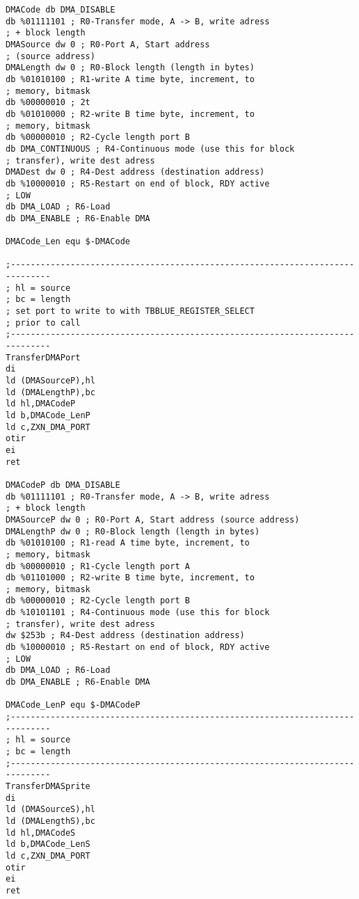 \begin{enumerate}
\begin{verbatim}
DMACode db DMA_DISABLE
db %01111101 ; R0-Transfer mode, A -> B, write adress
; + block length
DMASource dw 0 ; R0-Port A, Start address
; (source address)
DMALength dw 0 ; R0-Block length (length in bytes)
db %01010100 ; R1-write A time byte, increment, to
; memory, bitmask
db %00000010 ; 2t
db %01010000 ; R2-write B time byte, increment, to
; memory, bitmask
db %00000010 ; R2-Cycle length port B
db DMA_CONTINUOUS ; R4-Continuous mode (use this for block
; transfer), write dest adress
DMADest dw 0 ; R4-Dest address (destination address)
db %10000010 ; R5-Restart on end of block, RDY active
; LOW
db DMA_LOAD ; R6-Load
db DMA_ENABLE ; R6-Enable DMA

DMACode_Len equ $-DMACode

;------------------------------------------------------------------------------
; hl = source
; bc = length
; set port to write to with TBBLUE_REGISTER_SELECT
; prior to call
;------------------------------------------------------------------------------
TransferDMAPort
di
ld (DMASourceP),hl
ld (DMALengthP),bc
ld hl,DMACodeP
ld b,DMACode_LenP
ld c,ZXN_DMA_PORT
otir
ei
ret

DMACodeP db DMA_DISABLE
db %01111101 ; R0-Transfer mode, A -> B, write adress
; + block length
DMASourceP dw 0 ; R0-Port A, Start address (source address)
DMALengthP dw 0 ; R0-Block length (length in bytes)
db %01010100 ; R1-read A time byte, increment, to
; memory, bitmask
db %00000010 ; R1-Cycle length port A
db %01101000 ; R2-write B time byte, increment, to
; memory, bitmask
db %00000010 ; R2-Cycle length port B
db %10101101 ; R4-Continuous mode (use this for block
; transfer), write dest adress
dw $253b ; R4-Dest address (destination address)
db %10000010 ; R5-Restart on end of block, RDY active
; LOW
db DMA_LOAD ; R6-Load
db DMA_ENABLE ; R6-Enable DMA

DMACode_LenP equ $-DMACodeP
;------------------------------------------------------------------------------
; hl = source
; bc = length
;------------------------------------------------------------------------------
TransferDMASprite
di
ld (DMASourceS),hl
ld (DMALengthS),bc
ld hl,DMACodeS
ld b,DMACode_LenS
ld c,ZXN_DMA_PORT
otir
ei
ret


\end{verbatim}
\end{enumerate}

